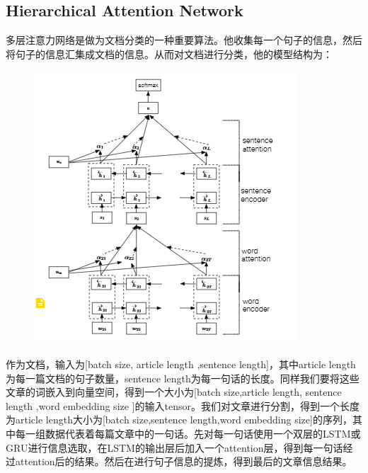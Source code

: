 \documentclass{article}
\begin{document}
\subsection{Hierarchical Attention Network}

多层注意力网络是做为文档分类的一种重要算法。他收集每一个句子的信息，然后将句子的信息汇集成文档的信息。从而对文档进行分类，他的模型结构为：

\begin{figure}
\centering
\includegraphics[]{hattention.png}
\end{figure}


作为文档，输入为[batch size, article length ,sentence length]，其中article length 为每一篇文档的句子数量，sentence length为每一句话的长度。同样我们要将这些文章的词嵌入到向量空间，得到一个大小为[batch size,article length, sentence length ,word embedding size ]的输入tensor。我们对文章进行分割，得到一个长度为article length大小为[batch size,sentence length,word embedding size]的序列，其中每一组数据代表着每篇文章中的一句话。先对每一句话使用一个双层的LSTM或GRU进行信息选取，在LSTM的输出层后加入一个attention层，得到每一句话经过attention后的结果。然后在进行句子信息的提炼，得到最后的文章信息结果。
\end{document}
